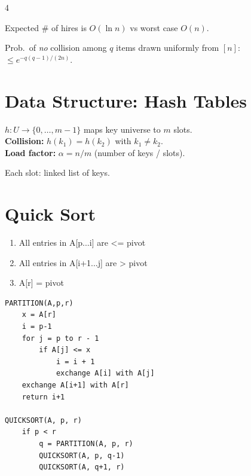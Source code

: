 \documentclass[8pt,a4paper,landscape]{extarticle}
\begin{document}
\begin{multicols*}{4}
\begin{prop}[title=Hiring Problem]
Expected $\#$ of hires is $O(\ln n)$ vs worst case $O(n)$.
\end{prop}

\begin{prop}[title=Birthday lemma]
Prob.\ of \emph{no} collision among $q$ items drawn uniformly from $[n]$:
$\leq e^{-q(q-1)/(2n)}$.
\end{prop}

\section{Data Structure: Hash Tables}

\begin{defn}[title=Hash function]
$h: U\to\{0,\ldots,m{-}1\}$ maps key universe to $m$ slots.\\
\textbf{Collision:} $h(k_1)=h(k_2)$ with $k_1\neq k_2$.\\
\textbf{Load factor:} $\alpha = n/m$ (number of keys / slots).
\end{defn}

\begin{prop}[title=Chaining (collision resolution)]
Each slot: linked list of keys.
\end{prop}

\section{Quick Sort}
\begin{thm}[title=Loop invariant of Partitioning]
\begin{enumerate}
  \item All entries in A[p...i] are <= pivot
  \item All entries in A[i+1...j] are > pivot
  \item A[r] = pivot
\end{enumerate}
\end{thm}

\begin{lstlisting}
PARTITION(A,p,r)
    x = A[r]
    i = p-1
    for j = p to r - 1
        if A[j] <= x
            i = i + 1
            exchange A[i] with A[j]
    exchange A[i+1] with A[r]
    return i+1

QUICKSORT(A, p, r)
    if p < r
        q = PARTITION(A, p, r)
        QUICKSORT(A, p, q-1)
        QUICKSORT(A, q+1, r)
\end{lstlisting}


\end{multicols*}
\end{document}
